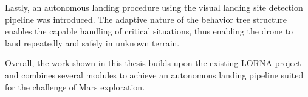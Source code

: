 Lastly, an autonomous landing procedure using the visual landing site detection pipeline was introduced.  The adaptive nature of the behavior tree structure enables the capable handling of critical situations, thus enabling the drone to land repeatedly and safely in unknown terrain.

Overall, the work shown in this thesis builds upon the existing LORNA project and combines several modules to achieve an autonomous landing pipeline suited for the challenge of Mars exploration. 